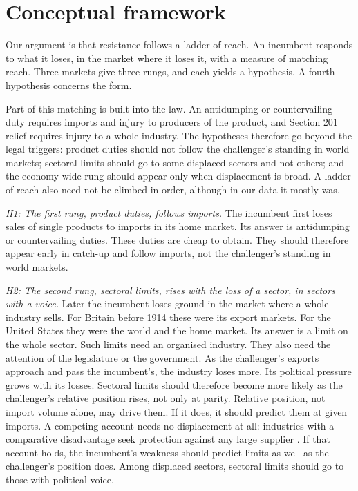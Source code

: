 \documentclass[review,authoryear,12pt]{elsarticle}
\begin{document}
\section{Conceptual framework}\label{sec:framework}

Our argument is that resistance follows a ladder of reach. An incumbent responds to what it loses, in the market where it loses it, with a measure of matching reach. Three markets give three rungs, and each yields a hypothesis. A fourth hypothesis concerns the form.

Part of this matching is built into the law. An antidumping or countervailing duty requires imports and injury to producers of the product, and Section 201 relief requires injury to a whole industry. The hypotheses therefore go beyond the legal triggers: product duties should not follow the challenger's standing in world markets; sectoral limits should go to some displaced sectors and not others; and the economy-wide rung should appear only when displacement is broad. A ladder of reach also need not be climbed in order, although in our data it mostly was.

\emph{H1: The first rung, product duties, follows imports.} The incumbent first loses sales of single products to imports in its home market. Its answer is antidumping or countervailing duties. These duties are cheap to obtain. They should therefore appear early in catch-up and follow imports, not the challenger's standing in world markets.

\emph{H2: The second rung, sectoral limits, rises with the loss of a sector, in sectors with a voice.} Later the incumbent loses ground in the market where a whole industry sells. For Britain before 1914 these were its export markets. For the United States they were the world and the home market. Its answer is a limit on the whole sector. Such limits need an organised industry. They also need the attention of the legislature or the government. As the challenger's exports approach and pass the incumbent's, the industry loses more. Its political pressure grows with its losses. Sectoral limits should therefore become more likely as the challenger's relative position rises, not only at parity. Relative position, not import volume alone, may drive them. If it does, it should predict them at given imports. A competing account needs no displacement at all: industries with a comparative disadvantage seek protection against any large supplier \citep{grossman1994}. If that account holds, the incumbent's weakness should predict limits as well as the challenger's position does. Among displaced sectors, sectoral limits should go to those with political voice.
\end{document}
